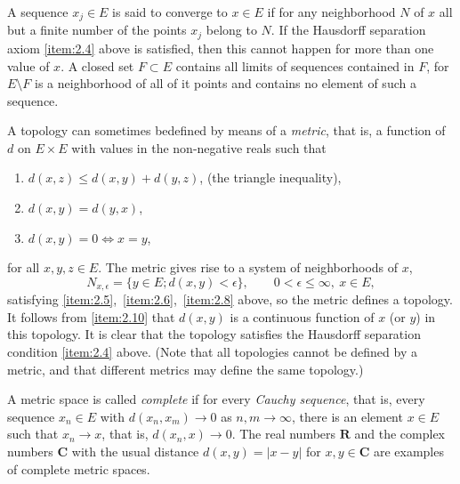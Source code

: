 A sequence $x_j\in E$ is said to converge to $x\in E$ if for any
neighborhood $N$ of $x$ all but a finite number of the points $x_j$
belong to $N$. If the Hausdorff separation axiom \ref{item:2.4} above
is satisfied, then this cannot happen for more than one value of
$x$. A closed set $F\subset E$ contains all limits of sequences
contained in $F$, for $E\setminus F$ is a neighborhood of all of it
points and contains no element of such a sequence.

A topology can sometimes bedefined by means of a \emph{metric}, that
is, a function of $d$ on $E\times E$ with values in the non-negative
reals such that
\begin{enumerate}[label=\alph*),itemindent=!,leftmargin=0pt]
\item\label{item:2.10} $d(x,z)\leq d(x,y)+d(y,z)$, (the triangle
  inequality),
\item\label{item:2.11} $d(x,y)=d(y,x)$,
\item\label{item:2.12} $d(x,y)=0\Longleftrightarrow x=y$,
\end{enumerate}
for all $x,y,z\in E$. The metric gives rise to a system of
neighborhoods of $x$,
\begin{displaymath}
  N_{x,\epsilon} = \{y\in E; d(x,y)<\epsilon\},\qquad
  0<\epsilon\leq\infty,\ x\in E,
\end{displaymath}
satisfying \ref{item:2.5},~\ref{item:2.6},~\ref{item:2.8} above, so
the metric defines a topology. It follows from \ref{item:2.10} that
$d(x,y)$ is a continuous function of $x$ (or $y$) in this topology. It
is clear that the topology satisfies the Hausdorff separation
condition \ref{item:2.4} above. (Note that all topologies cannot be
defined by a metric, and that different metrics may define the same
topology.)

A metric space is called \emph{complete} if for every \emph{Cauchy
  sequence}, that is, every sequence $x_n\in E$ with $d(x_n,x_m)\to 0$
as $n,m\to\infty$, there is an element $x\in E$ such that $x_n\to x$,
that is, $d(x_n,x)\to 0$. The real numbers $\mathbf{R}$ and the
complex numbers $\mathbf{C}$ with the usual distance $d(x,y)=|x-y|$
for $x,y\in \mathbf{C}$ are examples of complete metric spaces.

